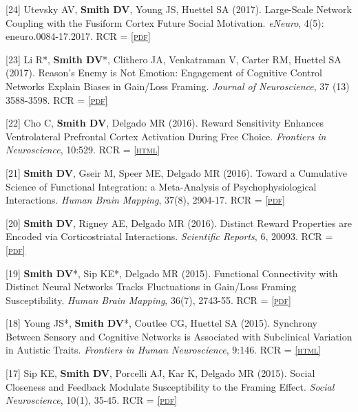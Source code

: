 \documentclass[11pt, letterpaper]{article}
\newcommand{\html}[1]{\href{#1}{\scriptsize\textsc{[html]}}}
\newcommand{\pdf}[1]{\href{#1}{\scriptsize\textsc{[pdf]}}}
\begin{document}
\begin{hangparas}{.5in}{1}

[24] Utevsky AV, \textbf{Smith DV}, Young JS, Huettel SA (2017). Large-Scale Network Coupling with the Fusiform Cortex Future Social Motivation. \textit{eNeuro}, 4(5): eneuro.0084-17.2017. RCR =  \pdf{http://www.eneuro.org/content/eneuro/4/5/eneuro.0084-17.2017.full.pdf}

[23] Li R*, \textbf{Smith DV}*, Clithero JA, Venkatraman V, Carter RM, Huettel SA (2017). Reason’s Enemy is Not Emotion: Engagement of Cognitive Control Networks Explain Biases in Gain/Loss Framing. \textit{Journal of Neuroscience}, 37 (13) 3588-3598. RCR =  \pdf{http://www.jneurosci.org/content/jneuro/37/13/3588.full.pdf}

[22] Cho C, \textbf{Smith DV}, Delgado MR (2016). Reward Sensitivity Enhances Ventrolateral Prefrontal Cortex Activation During Free Choice. \textit{Frontiers in Neuroscience}, 10:529. RCR =  \html{https://www.ncbi.nlm.nih.gov/pmc/articles/PMC5114280/}

[21] \textbf{Smith DV}, Gseir M, Speer ME, Delgado MR (2016). Toward a Cumulative Science of Functional Integration: a Meta-Analysis of Psychophysiological Interactions. \textit{Human Brain Mapping}, 37(8), 2904-17. RCR =  \pdf{http://nwkpsych.rutgers.edu/neuroscience/publications/2016_SmithDelgado_HBM.pdf}

[20] \textbf{Smith DV}, Rigney AE, Delgado MR (2016). Distinct Reward Properties are Encoded via Corticostriatal Interactions. \textit{Scientific Reports}, 6, 20093. RCR =  \pdf{https://www.nature.com/articles/srep20093.pdf}

[19] \textbf{Smith DV}*, Sip KE*, Delgado MR (2015). Functional Connectivity with Distinct Neural Networks Tracks Fluctuations in Gain/Loss Framing Susceptibility. \textit{Human Brain Mapping}, 36(7), 2743-55. RCR =  \pdf{http://nwkpsych.rutgers.edu/neuroscience/publications/2015_SmithSipDelgado_HBM.pdf}

[18] Young JS*, \textbf{Smith DV}*, Coutlee CG, Huettel SA (2015). Synchrony Between Sensory and Cognitive Networks is Associated with Subclinical Variation in Autistic Traits. \textit{Frontiers in Human Neuroscience}, 9:146. RCR =  \html{https://www.frontiersin.org/articles/10.3389/fnhum.2015.00146/full}

[17] Sip KE, \textbf{Smith DV}, Porcelli AJ, Kar K, Delgado MR (2015). Social Closeness and Feedback Modulate Susceptibility to the Framing Effect. \textit{Social Neuroscience}, 10(1), 35-45. RCR =  \pdf{http://nwkpsych.rutgers.edu/neuroscience/publications/2014_SipSmithDelgado_SocNeuro.pdf}


\end{hangparas}
\end{document}
